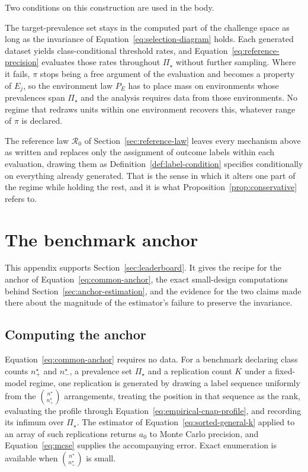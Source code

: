 \documentclass[11pt]{article}
\newcommand{\Regime}{\mathcal{R}}
\newcommand{\PSet}{\Pi_\star}
\theoremstyle{remark}
\begin{document}
Two conditions on this construction are used in the body.

The target-prevalence set stays in the computed part of the challenge space as long as the invariance of Equation~\eqref{eq:selection-diagram} holds. Each generated dataset yields class-conditional threshold rates, and Equation~\eqref{eq:reference-precision} evaluates those rates throughout $\PSet$ without further sampling. Where it fails, $\pi$ stops being a free argument of the evaluation and becomes a property of $E_j$, so the environment law $P_E$ has to place mass on environments whose prevalences span $\PSet$ and the analysis requires data from those environments. No regime that redraws units within one environment recovers this, whatever range of $\pi$ is declared.

The reference law $\Regime_0$ of Section~\ref{sec:reference-law} leaves every mechanism above as written and replaces only the assignment of outcome labels within each evaluation, drawing them as Definition~\ref{def:label-condition} specifies conditionally on everything already generated. That is the sense in which it alters one part of the regime while holding the rest, and it is what Proposition~\ref{prop:conservative} refers to.

\section{The benchmark anchor}
\label{app:anchor}

This appendix supports Section~\ref{sec:leaderboard}. It gives the recipe for the anchor of Equation~\eqref{eq:common-anchor}, the exact small-design computations behind Section~\ref{sec:anchor-estimation}, and the evidence for the two claims made there about the magnitude of the estimator's failure to preserve the invariance.

\subsection{Computing the anchor}

Equation~\eqref{eq:common-anchor} requires no data. For a benchmark declaring class counts $n^\star_+$ and $n^\star_-$, a prevalence set $\PSet$ and a replication count $K$ under a fixed-model regime, one replication is generated by drawing a label sequence uniformly from the $\binom{n^\star}{n^\star_+}$ arrangements, treating the position in that sequence as the rank, evaluating the profile through Equation~\eqref{eq:empirical-cnap-profile}, and recording its infimum over $\PSet$. The estimator of Equation~\eqref{eq:sorted-general-k} applied to an array of such replications returns $a_0$ to Monte Carlo precision, and Equation~\eqref{eq:mcse} supplies the accompanying error. Exact enumeration is available when $\binom{n^\star}{n^\star_+}$ is small.
\end{document}
